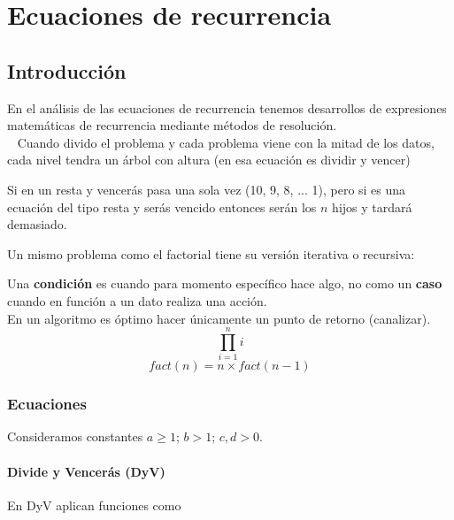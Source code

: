 \documentclass[tikz,11pt,fleqn]{book} %
\begin{document}


\chapter{Ecuaciones de recurrencia}

\section{Introducción}
En el análisis de las ecuaciones de recurrencia tenemos desarrollos de expresiones matemáticas de recurrencia mediante métodos de resolución.
\\~
Cuando divido el problema y cada problema viene con la mitad de los datos, cada nivel tendra un árbol con altura (en esa ecuación es dividir y vencer)

Si en un resta y vencerás pasa una sola vez (10, 9, 8, ... 1), pero si es una ecuación del tipo resta y serás vencido entonces serán los $n$ hijos y tardará demasiado.

Un mismo problema como el factorial tiene su versión iterativa o recursiva:

Una \textbf{condición} es cuando para momento específico hace algo, no como un \textbf{caso} cuando en función a un dato realiza una acción.
\\
En un algoritmo es óptimo hacer únicamente un punto de retorno (canalizar).
\\

$$
	\prod_{i=1}^ni
$$
$$
	fact(n)=n\times fact(n-1)
$$

\subsection{Ecuaciones}
Consideramos constantes \( a \ge 1 \); \( b > 1 \); \( c, d > 0 \).

\subsubsection{Divide y Vencerás (DyV)}
En DyV aplican funciones como
\end{document}
